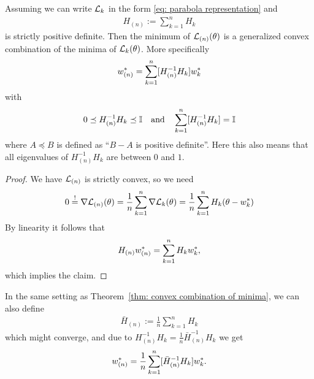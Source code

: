 \begin{theorem}
	\label{thm: convex combination of minima}
	Assuming we can write \(\mathcal{L}_k\) in the form \eqref{eq: parabola representation} and
	\begin{align*}
		H_{(n)}:=\sum_{k=1}^n H_k
	\end{align*}
	is strictly positive definite. Then the minimum of \(\mathcal{L}_{(n)}(\theta)\) is a
	generalized convex combination of the minima of \(\mathcal{L}_k(\theta)\). More
	specifically
	\begin{align*}
		w^*_{(n)} = \sum_{k=1}^n [H_{(n)}^{-1} H_k] w^*_{k}
	\end{align*}
	with
	\begin{align*}
		0\preceq H_{(n)}^{-1}H_k\preceq \mathbb{I}
		\quad \text{and}\quad
		\sum_{k=1}^n [H_{(n)}^{-1} H_k] = \mathbb{I}
	\end{align*}
	where \(A\preceq B\) is defined as ``\(B-A\) is positive definite''. Here
	this also means that all eigenvalues of \(H_{(n)}^{-1}H_k\) are between
	\(0\) and \(1\).
\end{theorem}
\begin{proof}
	We have \(\mathcal{L}_{(n)}\) is strictly convex, so we need
	\begin{align*}
		0 \overset!= \nabla\mathcal{L}_{(n)}(\theta)
		=\frac1n \sum_{k=1}^n \nabla\mathcal{L}_k(\theta)
		= \frac1n \sum_{k=1}^n H_k(\theta - w^*_k)
	\end{align*}
	By linearity it follows that
	\begin{align*}
		H_{(n)} w^*_{(n)} = \sum_{k=1}^n H_k w^*_k,
	\end{align*}
	which implies the claim.
\end{proof}

\begin{corollary}
	In the same setting as Theorem~\ref{thm: convex combination of minima}, we
	can also define
	\begin{align*}
		\bar{H}_{(n)} := \frac1n\sum_{k=1}^n H_k
	\end{align*}
	which might converge, and due to \(H_{(n)}^{-1}H_k = \tfrac1n\bar{H}_{(n)}^{-1}H_k\)
	we get
	\begin{align*}
		w^*_{(n)} = \frac1n\sum_{k=1}^n [\bar{H}_{(n)}^{-1} H_k] w^*_{k}.
	\end{align*}
\end{corollary}
